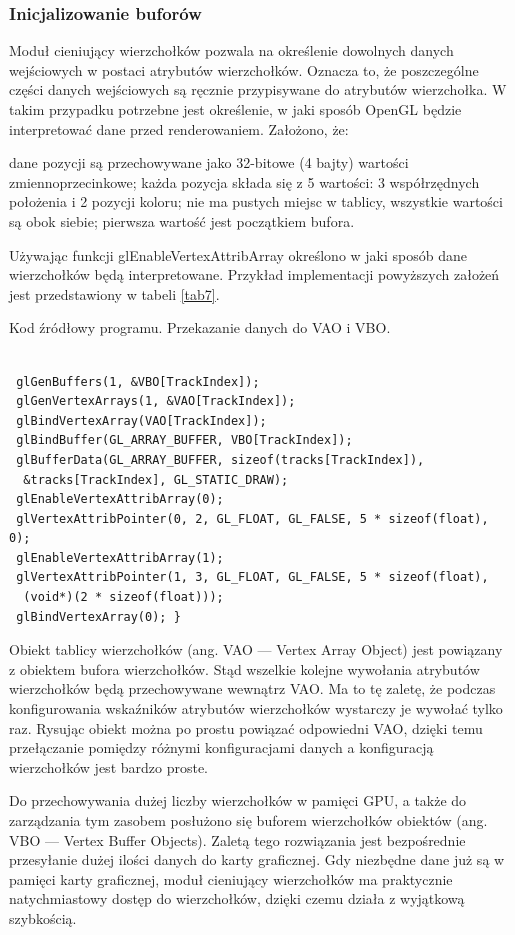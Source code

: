 \subsubsection{Inicjalizowanie buforów}
Moduł cieniujący wierzchołków pozwala na określenie dowolnych danych wejściowych w postaci atrybutów wierzchołków. Oznacza to, że poszczególne części danych wejściowych są ręcznie przypisywane do atrybutów wierzchołka. W takim przypadku potrzebne jest określenie, w jaki sposób OpenGL będzie interpretować dane przed renderowaniem. Założono, że:
\begin{itemize}
\itemi dane pozycji są przechowywane jako 32-bitowe (4 bajty) wartości zmiennoprzecinkowe;
\itemi każda pozycja składa się z 5 wartości: 3 współrzędnych położenia i 2 pozycji koloru;
\itemi nie ma pustych miejsc w tablicy, wszystkie wartości są obok siebie;
\itemi pierwsza wartość jest początkiem bufora.
\end{itemize}
Używając funkcji glEnableVertexAttribArray określono w jaki sposób dane wierzchołków będą interpretowane. Przykład implementacji powyższych założeń jest przedstawiony w tabeli \ref{tab7}.
\begin{table}[H]
\caption{Kod źródłowy programu. Przekazanie danych do VAO i VBO.}
\label{tab7}
\begin{lstlisting}[frame=single]  % Start your code-block

 glGenBuffers(1, &VBO[TrackIndex]);
 glGenVertexArrays(1, &VAO[TrackIndex]);
 glBindVertexArray(VAO[TrackIndex]);
 glBindBuffer(GL_ARRAY_BUFFER, VBO[TrackIndex]);
 glBufferData(GL_ARRAY_BUFFER, sizeof(tracks[TrackIndex]), 
  &tracks[TrackIndex], GL_STATIC_DRAW);
 glEnableVertexAttribArray(0);
 glVertexAttribPointer(0, 2, GL_FLOAT, GL_FALSE, 5 * sizeof(float), 0);
 glEnableVertexAttribArray(1);
 glVertexAttribPointer(1, 3, GL_FLOAT, GL_FALSE, 5 * sizeof(float), 
  (void*)(2 * sizeof(float)));
 glBindVertexArray(0); }
\end{lstlisting}
\end{table}
Obiekt tablicy wierzchołków (ang. VAO --- Vertex Array Object) jest powiązany z obiektem bufora wierzchołków. Stąd wszelkie kolejne wywołania atrybutów wierzchołków będą przechowywane wewnątrz VAO. Ma to tę zaletę, że podczas konfigurowania wskaźników atrybutów wierzchołków wystarczy je wywołać tylko raz. Rysując obiekt można po prostu powiązać odpowiedni VAO, dzięki temu przełączanie pomiędzy różnymi konfiguracjami danych a konfiguracją wierzchołków jest bardzo proste.

Do przechowywania dużej liczby wierzchołków w pamięci GPU, a także do zarządzania tym zasobem posłużono się buforem wierzchołków obiektów (ang. VBO --- Vertex Buffer Objects). Zaletą tego rozwiązania jest bezpośrednie przesyłanie dużej ilości danych do karty graficznej. Gdy niezbędne dane już są w pamięci karty graficznej, moduł cieniujący wierzchołków ma praktycznie natychmiastowy dostęp do wierzchołków, dzięki czemu działa z wyjątkową szybkością.

